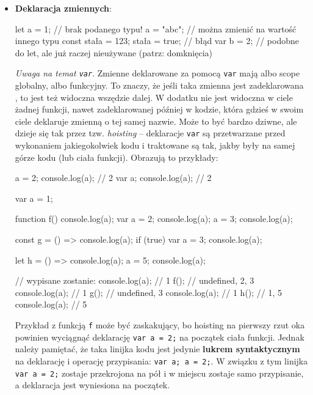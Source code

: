 \begin{itemize}
\item \textbf{Deklaracja zmiennych}:
    \begin{js}
        let a = 1; // brak podanego typu!
        a = "abc"; // można zmienić na wartość innego typu
        const stała = 123;
        stała = true; // błąd
        var b = 2; // podobne do let, ale już raczej nieużywane (patrz: domknięcia)
    \end{js}

    \textit{Uwaga na temat \texttt{var}}. Zmienne deklarowane za pomocą \texttt{var} mają albo scope globalny, albo funkcyjny. To znaczy, że jeśli taka zmienna jest zadeklarowana , to jest też widoczna wszędzie dalej. W dodatku nie jest widoczna w ciele żadnej funkcji, nawet zadeklarowanej później w kodzie, która gdzieś w swoim ciele deklaruje zmienną o tej samej nazwie. Może to być bardzo dziwne, ale dzieje się tak przez tzw. \textit{hoisting} -- deklaracje \texttt{var} są przetwarzane przed wykonaniem jakiegokolwiek kodu i traktowane są tak, jakby były na samej górze kodu (lub ciała funkcji). Obrazują to przykłady:
    \begin{js}
        a = 2;
        console.log(a); // 2
        var a;
        console.log(a); // 2
    \end{js}
    \begin{js}
        var a = 1;

        function f() {
            console.log(a);
            var a = 2;
            console.log(a);
            a = 3;
            console.log(a);
        }
        
        const g = () => {
            console.log(a);
            if (true) {
                var a = 3;
            }
            console.log(a);
        }
        
        let h = () => { 
            console.log(a);
            a = 5;
            console.log(a);
        }

        // wypisane zostanie:
        console.log(a); // 1
        f(); // undefined, 2, 3
        console.log(a); // 1
        g(); // undefined, 3
        console.log(a); // 1
        h(); // 1, 5
        console.log(a); // 5
    \end{js}

    Przykład z funkcją \texttt{f} może być zaskakujący, bo hoisting na pierwszy rzut oka powinien wyciągnąć deklarację \texttt{var a = 2;} na początek ciała funkcji. Jednak należy pamiętać, że taka linijka kodu jest jedynie \textbf{lukrem syntaktycznym} na deklarację i operację przypisania: \texttt{var a; a = 2;}. W związku z tym linijka \texttt{var a = 2;} zostaje przekrojona na pół i w miejscu zostaje samo przypisanie, a deklaracja jest wyniesiona na początek.


\end{itemize}
